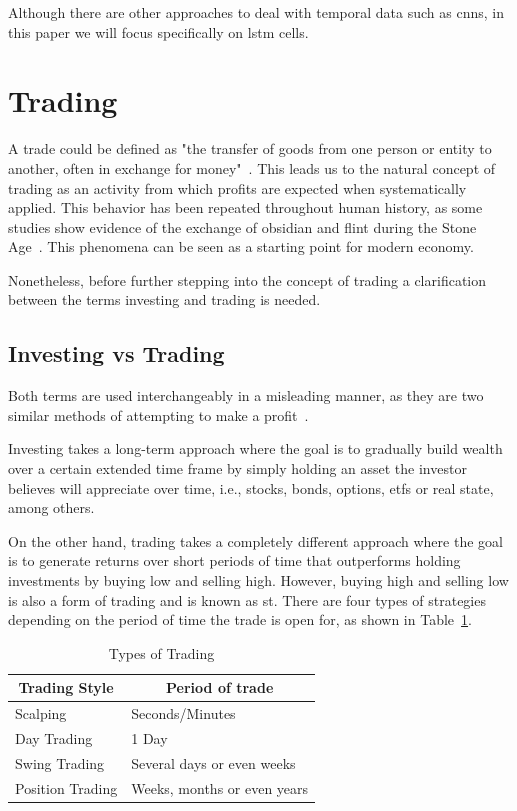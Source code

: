Although there are other approaches to deal with temporal data such as \glspl{cnn}, in this paper we will focus specifically on \gls{lstm} cells.

\section{Trading}

A trade could be defined as "the transfer of goods from one person or entity to another, often in exchange for money"~\cite{tradeDefinition}. This leads us to the natural concept of trading as an activity from which profits are expected when systematically applied. This behavior has been repeated throughout human history, as some studies show evidence of the exchange of obsidian and flint during the Stone Age~\cite{oxfordArcheology,obsidianTrade}. This phenomena can be seen as a starting point for modern economy.

Nonetheless, before further stepping into the concept of trading a clarification between the terms investing and trading is needed.

\subsection{Investing vs Trading}

Both terms are used interchangeably in a misleading manner, as they are two similar methods of attempting to make a profit~\cite{investingVsTrading}.

Investing takes a long-term approach where the goal is to gradually build wealth over a certain extended time frame by simply holding an asset the investor believes will appreciate over time, i.e., stocks, bonds, options, \glspl{etf} or real state, among others.

On the other hand, trading takes a completely different approach where the goal is to generate returns over short periods of time that outperforms holding investments by buying low and selling high. However, buying high and selling low is also a form of trading and is known as \gls{st}. There are four types of strategies depending on the period of time the trade is open for, as shown in Table~\ref{tab:types-trading}.

\begin{table}[h]
\caption{\label{tab:types-trading} Types of Trading}
\centering
\begin{tabular}{@{}|l|l|@{}}
    \toprule
    \multicolumn{1}{|c|}{\textbf{Trading Style}} & \multicolumn{1}{c|}{\textbf{Period of trade}} \\ \midrule
        Scalping         & Seconds/Minutes             \\
        Day Trading      & 1 Day                       \\
        Swing Trading    & Several days or even weeks  \\
        Position Trading & Weeks, months or even years \\ \bottomrule
\end{tabular}
\end{table}

